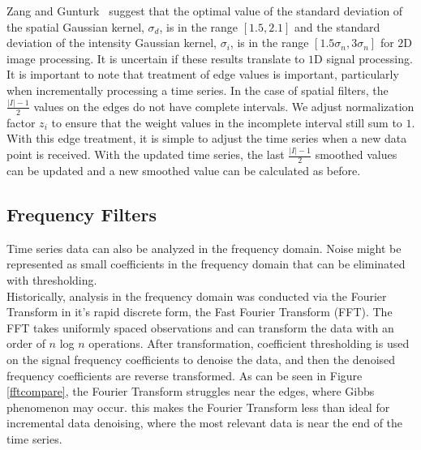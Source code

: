 \documentclass[11pt]{article}
\theoremstyle{definition}
\begin{document}
Zang and Gunturk~\cite{Zang08} suggest that the optimal value of the standard deviation of the spatial Gaussian kernel, $\sigma_d$, is in the range $[ 1.5, 2.1 ]$ and the standard deviation of the intensity Gaussian kernel, $\sigma_i$, is in the range $[ 1.5 \sigma_n, 3 \sigma_n ]$ for $2$D image processing. It is uncertain if these results translate to $1$D signal processing.\\

It is important to note that treatment of edge values is important, particularly when incrementally processing a time series. In the case of spatial filters, the $\frac{\lvert I \rvert - 1}{2}$ values on the edges do not have complete intervals. We adjust normalization factor $z_i$ to ensure that the weight values in the incomplete interval still sum to $1$.\\

With this edge treatment, it is simple to adjust the time series when a new data point is received. With the updated time series, the last $\frac{\lvert I \rvert - 1}{2}$ smoothed values can be updated and a new smoothed value can be calculated as before.

\newpage

\subsection{Frequency Filters}

Time series data can also be analyzed in the frequency domain. Noise might be represented as small coefficients in the frequency domain that can be eliminated with thresholding.\\

Historically, analysis in the frequency domain was conducted via the Fourier Transform in it\rq{}s rapid discrete form, the Fast Fourier Transform (FFT). The FFT takes uniformly spaced observations and can transform the data with an order of $n$ log $n$ operations. After transformation, coefficient thresholding is used on the signal frequency coefficients to denoise the data, and then the denoised frequency coefficients are reverse transformed. As can be seen in Figure \ref{fftcompare}, the Fourier Transform struggles near the edges, where Gibbs phenomenon may occur. this makes the Fourier Transform less than ideal for incremental data denoising, where the most relevant data is near the end of the time series.\\
\end{document}
